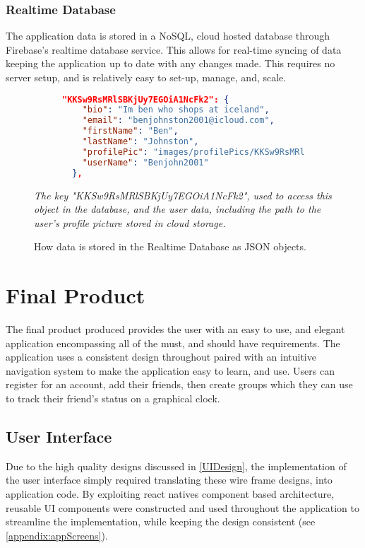 \subsubsection{Realtime Database}
The application data is stored in a NoSQL, cloud hosted database through Firebase's realtime database service. This allows for real-time syncing of data keeping the application up to date with any changes made. This requires no server setup, and is relatively easy to set-up, manage, and, scale.
\begin{figure}[!htbp]
\centering
\begin{subfigure}[b]{0.85\textwidth}
\begin{lstlisting}[language=json]
"KKSw9RsMRlSBKjUy7EGOiA1NcFk2": {
    "bio": "Im ben who shops at iceland",
    "email": "benjohnston2001@icloud.com",
    "firstName": "Ben",
    "lastName": "Johnston",
    "profilePic": "images/profilePics/KKSw9RsMRlSBKjUy7EGOiA1NcFk2",
    "userName": "Benjohn2001"
  },
\end{lstlisting}
\end{subfigure}
\caption{How data is stored in the Realtime Database as JSON objects.}
\small\par\textit{{The key "KKSw9RsMRlSBKjUy7EGOiA1NcFk2", used to access this object in the database, and the user data, including the path to the user's profile picture stored in cloud storage.}}
\label{jsonResp}
\end{figure}

\section{Final Product}
The final product produced provides the user with an easy to use, and elegant application encompassing all of the must, and should have requirements. The application uses a consistent design throughout paired with an intuitive navigation system to make the application easy to learn, and use. Users can register for an account, add their friends, then create groups which they can use to track their friend's status on a graphical clock.
\subsection{User Interface}
Due to the high quality designs discussed in \ref{UIDesign}, the implementation of the user interface simply required translating these wire frame designs, into application code.
By exploiting react natives component based architecture, reusable UI components were constructed and used throughout the application to streamline the implementation, while keeping the design consistent (see \ref{appendix:appScreens}).
